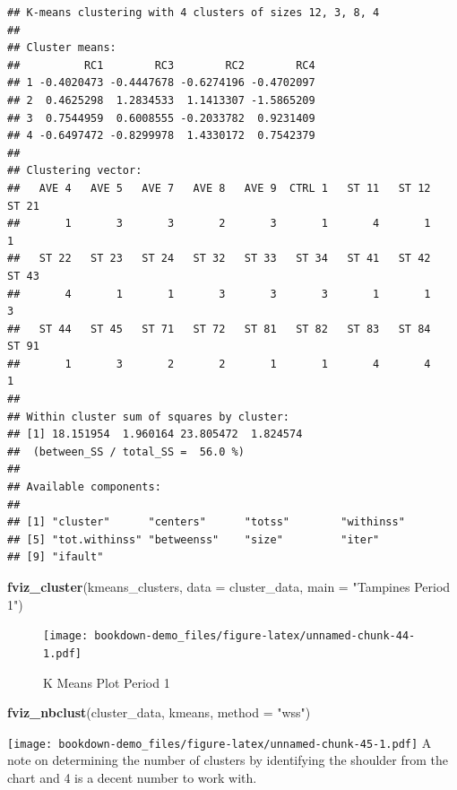 \documentclass[]{book}
\newenvironment{Shaded}{\begin{snugshade}}{\end{snugshade}}
\newcommand{\KeywordTok}[1]{\textcolor[rgb]{0.13,0.29,0.53}{\textbf{#1}}}
\newcommand{\DataTypeTok}[1]{\textcolor[rgb]{0.13,0.29,0.53}{#1}}
\newcommand{\StringTok}[1]{\textcolor[rgb]{0.31,0.60,0.02}{#1}}
\newcommand{\NormalTok}[1]{#1}
\begin{document}
\begin{verbatim}
## K-means clustering with 4 clusters of sizes 12, 3, 8, 4
## 
## Cluster means:
##          RC1        RC3        RC2        RC4
## 1 -0.4020473 -0.4447678 -0.6274196 -0.4702097
## 2  0.4625298  1.2834533  1.1413307 -1.5865209
## 3  0.7544959  0.6008555 -0.2033782  0.9231409
## 4 -0.6497472 -0.8299978  1.4330172  0.7542379
## 
## Clustering vector:
##   AVE 4   AVE 5   AVE 7   AVE 8   AVE 9  CTRL 1   ST 11   ST 12   ST 21 
##       1       3       3       2       3       1       4       1       1 
##   ST 22   ST 23   ST 24   ST 32   ST 33   ST 34   ST 41   ST 42   ST 43 
##       4       1       1       3       3       3       1       1       3 
##   ST 44   ST 45   ST 71   ST 72   ST 81   ST 82   ST 83   ST 84   ST 91 
##       1       3       2       2       1       1       4       4       1 
## 
## Within cluster sum of squares by cluster:
## [1] 18.151954  1.960164 23.805472  1.824574
##  (between_SS / total_SS =  56.0 %)
## 
## Available components:
## 
## [1] "cluster"      "centers"      "totss"        "withinss"    
## [5] "tot.withinss" "betweenss"    "size"         "iter"        
## [9] "ifault"
\end{verbatim}

\begin{Shaded}
\begin{Highlighting}[]
\KeywordTok{fviz_cluster}\NormalTok{(kmeans_clusters, }\DataTypeTok{data =}\NormalTok{ cluster_data, }\DataTypeTok{main =} \StringTok{"Tampines Period 1"}\NormalTok{)}
\end{Highlighting}
\end{Shaded}

\begin{figure}
\centering
\texttt{[image: bookdown-demo\_files/figure-latex/unnamed-chunk-44-1.pdf]}
\caption{\label{fig:unnamed-chunk-44}\label{fig:figs}K Means Plot Period 1}
\end{figure}

\begin{Shaded}
\begin{Highlighting}[]
\KeywordTok{fviz_nbclust}\NormalTok{(cluster_data, kmeans, }\DataTypeTok{method =} \StringTok{"wss"}\NormalTok{)}
\end{Highlighting}
\end{Shaded}

\texttt{[image: bookdown-demo\_files/figure-latex/unnamed-chunk-45-1.pdf]}
A note on determining the number of clusters by identifying the shoulder
from the chart and 4 is a decent number to work with.
\end{document}
